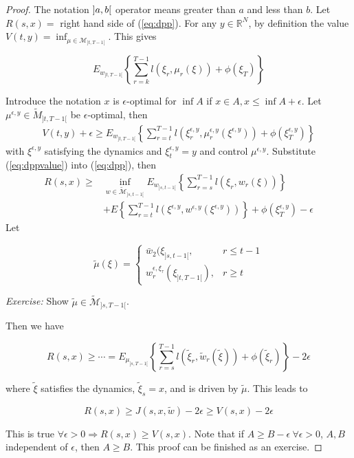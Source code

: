 \begin{proof}
The notation $\interval[open]{a}{b}$ operator means greater than $a$ and less than $b$.
Let $R(s,x) = $ right hand side of (\ref{eq:dpp}).
For any $y\in\mathbb{R}^N$, by definition the value $V(t,y) = \inf_{\mu\in\mathcal{M}_{]t,T-1[}}$.%
This gives

\begin{equation*}
E_{w_{]t,T-1[}}\left\lbrace \sum_{r=k}^{T-1}l(\xi_r,\mu_r(\xi))+\phi(\xi_T)\right\rbrace%
\end{equation*}

Introduce the notation $x$ is $\epsilon$-optimal for $\inf A$ if $x\in A, x\leq\inf A+\epsilon$.
Let $\mu^{\epsilon,y}\in\tilde{M}_{]t,T-1[}$ be $\epsilon$-optimal, then%
\begin{align}
\label{eq:dppvalue}
V(t,y) + \epsilon\geq E_{w_{]t,T-1[}}\left\lbrace \sum_{r=t}^{T-1}l(\xi_r^{\epsilon,y}, \mu_r^{\epsilon,y}(\xi^{\epsilon,y})) + \phi(\xi_T^{\epsilon,y})\right\rbrace%
\end{align}
with $\xi^{\epsilon,y}$ satisfying the dynamics and $\xi_t^{\epsilon,y} = y$ and control $\mu^{\epsilon,y}$.
Substitute (\ref{eq:dppvalue}) into (\ref{eq:dpp}), then
\begin{align*}
R(s,x) \geq &\inf_{w\in\tilde{\mathcal{M}}_{]s,t-1[}} E_{w_{]s,t-1[}}\left\lbrace \sum_{r=s}^{T-1}l(\xi_r,w_r(\xi))\right\rbrace \\%
&+ E\left\lbrace \sum_{r=t}^{T-1}l(\xi^{\epsilon,y},w^{\epsilon,y}(\xi^{\epsilon,y}))\right\rbrace + \phi(\xi_T^{\epsilon,y}) - \epsilon
\end{align*}
Let

\begin{equation*}
\tilde{\mu}(\xi) = \begin{cases} \bar{w}_2(\xi_{]s,t-1[}, & r\leq t-1 \\ w_r^{\epsilon,\xi_\tau}(\xi_{]t,T-1[}), & r\geq t \end{cases}%
\end{equation*}

\textit{Exercise:} Show $\tilde{\mu}\in\tilde{\mathcal{M}}_{]s,T-1[}$.%

Then we have

\begin{equation*}
R(s,x) \geq \cdots = E_{\mu_{]s,T-1[}}\left\lbrace\sum_{r=s}^{T-1} l(\tilde{\xi}_r,\tilde{w}_r(\tilde{\xi})) + \phi(\tilde{\xi}_r)\right\rbrace - 2\epsilon%
\end{equation*}

where $\tilde{\xi}$ satisfies the dynamics, $\tilde{\xi}_s=x$, and is driven by $\tilde{\mu}$.
This leads to

\begin{equation*}
R(s,x) \geq J(s,x,\tilde{w}) - 2\epsilon \geq V(s,x)-2\epsilon
\end{equation*}

This is true $\forall \epsilon>0\Rightarrow R(s,x)\geq V(s,x)$.
Note that if $A\geq B-\epsilon~\forall \epsilon > 0$, $A,B$ independent of $\epsilon$, then $A\geq B$.
This proof can be finished as an exercise.
\end{proof}


